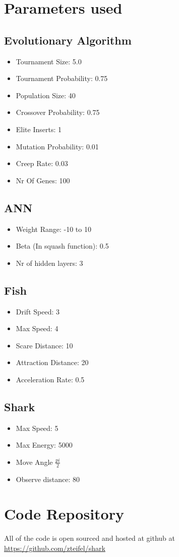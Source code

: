 \section{Parameters used\label{app:param}}
\subsection{Evolutionary Algorithm}
\begin{itemize}
\item Tournament Size: 5.0
\item Tournament Probability: 0.75
\item Population Size: 40
\item Crossover Probability: 0.75
\item Elite Inserts: 1
\item Mutation Probability: 0.01
\item Creep Rate: 0.03
\item Nr Of Genes: 100
\end{itemize}

\subsection{ANN}
\begin{itemize}
\item Weight Range: -10 to 10
\item Beta (In squash function): 0.5
\item Nr of hidden layers: 3
\end{itemize}

\subsection{Fish}
\begin{itemize}
\item Drift Speed: 3
\item Max Speed: 4
\item Scare Distance: 10
\item Attraction Distance: 20
\item Acceleration Rate: 0.5
\end{itemize}

\subsection{Shark}
\begin{itemize}
\item Max Speed: 5
\item Max Energy: 5000
\item Move Angle $\frac{pi}{2}$
\item Observe distance: 80
\end{itemize}

\section{Code Repository}
All of the code is open sourced and hosted at github at \url{https://github.com/zteifel/shark}

